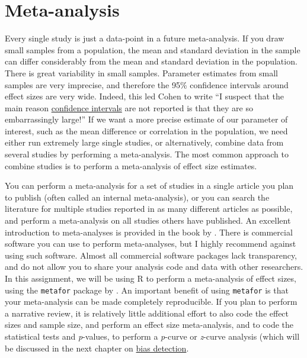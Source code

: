 \documentclass[
  oneside]{book}
\begin{document}
\hypertarget{meta}{%
\chapter{Meta-analysis}\label{meta}}

Every single study is just a data-point in a future meta-analysis. If you draw small samples from a population, the mean and standard deviation in the sample can differ considerably from the mean and standard deviation in the population. There is great variability in small samples. Parameter estimates from small samples are very imprecise, and therefore the 95\% confidence intervals around effect sizes are very wide. Indeed, this led Cohen \citeyearpar{cohen_earth_1994} to write ``I suspect that the main reason \protect\hyperlink{confint}{confidence intervals} are not reported is that they are so embarrassingly large!'' If we want a more precise estimate of our parameter of interest, such as the mean difference or correlation in the population, we need either run extremely large single studies, or alternatively, combine data from several studies by performing a meta-analysis. The most common approach to combine studies is to perform a meta-analysis of effect size estimates.

You can perform a meta-analysis for a set of studies in a single article you plan to publish (often called an internal meta-analysis), or you can search the literature for multiple studies reported in as many different articles as possible, and perform a meta-analysis on all studies others have published. An excellent introduction to meta-analyses is provided in the book by \citet{borenstein_introduction_2009}. There is commercial software you can use to perform meta-analyses, but I highly recommend against using such software. Almost all commercial software packages lack transparency, and do not allow you to share your analysis code and data with other researchers. In this assignment, we will be using R to perform a meta-analysis of effect sizes, using the \texttt{metafor} package by \citet{viechtbauer_conducting_2010}. An important benefit of using \texttt{metafor} is that your meta-analysis can be made completely reproducible. If you plan to perform a narrative review, it is relatively little additional effort to also code the effect sizes and sample size, and perform an effect size meta-analysis, and to code the statistical tests and \emph{p}-values, to perform a \emph{p}-curve or \emph{z}-curve analysis (which will be discussed in the next chapter on \protect\hyperlink{bias}{bias detection}.
\end{document}
